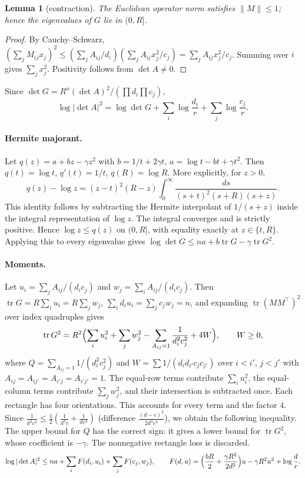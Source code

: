 \documentclass[11pt]{article}
\newtheorem{lemma}[theorem]{Lemma}
\theoremstyle{remark}
\newcommand{\tr}{\operatorname{tr}}
\begin{document}
\begin{lemma}[contraction]\label{lem:contract}
The Euclidean operator norm satisfies $\|M\|\le1$; hence the eigenvalues of $G$ lie in $(0,R]$.
\end{lemma}
\begin{proof}
By Cauchy--Schwarz, $(\sum_jM_{ij}x_j)^2\le(\sum_jA_{ij}/d_i)(\sum_jA_{ij}x_j^2/c_j)=\sum_jA_{ij}x_j^2/c_j$.
Summing over $i$ gives $\sum_j x_j^2$. Positivity follows from $\det A\ne0$.
\end{proof}

Since $\det G=R^n(\det A)^2/(\prod d_i\prod c_j)$,
\begin{equation}\label{eq:logdet}
\log|\det A|^2=\log\det G+\sum_i\log\frac{d_i}{r}+\sum_j\log\frac{c_j}{r}.
\end{equation}

\paragraph{Hermite majorant.} Let $q(z)=a+bz-\gamma z^2$ with $b=1/t+2\gamma t$, $a=\log t-bt+\gamma t^2$. Then
$q(t)=\log t$, $q'(t)=1/t$, $q(R)=\log R$. More explicitly, for $z>0$,
\[
 q(z)-\log z=(z-t)^2(R-z)
   \int_0^\infty\frac{ds}{(s+t)^2(s+R)(s+z)}.
\]
This identity follows by subtracting the Hermite interpolant of $1/(s+z)$
inside the integral representation of $\log z$. The integral converges and is
strictly positive. Hence $\log z\le q(z)$ on $(0,R]$, with equality exactly
at $z\in\{t,R\}$. Applying this to every eigenvalue gives
$\log\det G\le na+b\tr G-\gamma\tr G^2$.

\paragraph{Moments.} Let $u_i=\sum_jA_{ij}/(d_ic_j)$ and $w_j=\sum_iA_{ij}/(d_ic_j)$. Then $\tr G=R\sum_iu_i=R\sum_jw_j$,
$\sum_id_iu_i=\sum_jc_jw_j=n$, and expanding $\tr(MM^\top)^2$ over index quadruples gives
\[
\tr G^2=R^2\Bigl(\sum_iu_i^2+\sum_jw_j^2-\sum_{A_{ij}=1}\frac1{d_i^2c_j^2}+4W\Bigr),\qquad W\ge0,
\]
where $Q=\sum_{A_{ij}=1}1/(d_i^2c_j^2)$ and $W=\sum 1/(d_id_{i'}c_jc_{j'})$ over $i<i'$, $j<j'$ with $A_{ij}=A_{ij'}=A_{i'j}=A_{i'j'}=1$. The equal-row terms contribute $\sum_i u_i^2$, the equal-column terms
contribute $\sum_jw_j^2$, and their intersection is subtracted once. Each
rectangle has four orientations. This accounts for every term and the factor $4$.
Since
$\frac1{d^2c^2}\le\frac12(\frac1{d^3c}+\frac1{dc^3})$ (difference $\frac{(d-c)^2}{2d^3c^3}$), we obtain the following inequality. The upper bound for $Q$ has the correct
sign: it gives a lower bound for $\tr G^2$, whose coefficient is $-\gamma$.
The nonnegative rectangle loss is discarded.
\begin{equation}\label{eq:sep}
\log|\det A|^2\le na+\sum_iF(d_i,u_i)+\sum_jF(c_j,w_j),\qquad
F(d,u)=\Bigl(\frac{bR}2+\frac{\gamma R^2}{2d^2}\Bigr)u-\gamma R^2u^2+\log\frac dr .
\end{equation}
\end{document}
